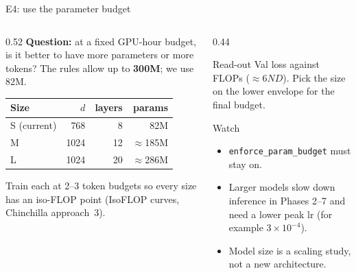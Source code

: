 \documentclass[aspectratio=169,11pt]{beamer}
\newcommand{\code}[1]{\texttt{\small #1}}
\begin{document}
\begin{frame}{E4: use the parameter budget}
  \begin{columns}[T]
    \begin{column}{0.52\textwidth}
      \small
      \textbf{Question:} at a fixed GPU-hour budget, is it better to have more parameters or more tokens?
      The rules allow up to \textbf{300M}; we use 82M.

      \vspace{2mm}
      \begin{tabular}{@{}lrrr@{}}
        \toprule
        Size & $d$ & layers & params\\
        \midrule
        S (current) & 768 & 8 & 82M\\
        M & 1024 & 12 & $\approx$185M\\
        L & 1024 & 20 & $\approx$286M\\
        \bottomrule
      \end{tabular}

      \vspace{2mm}
      Train each at 2--3 token budgets so every size has an iso-FLOP point (IsoFLOP curves, Chinchilla approach~3).
    \end{column}
    \begin{column}{0.44\textwidth}
      \begin{block}{Read-out}
        \small Val loss against FLOPs ($\approx 6ND$). Pick the size on the lower envelope for the final budget.
      \end{block}
      \begin{alertblock}{Watch}
        \small
        \begin{itemize}
          \item \code{enforce\_param\_budget} must stay on.
          \item Larger models slow down inference in Phases 2--7 and need a lower peak lr (for example $3\!\times\!10^{-4}$).
          \item Model size is a scaling study, not a new architecture.
        \end{itemize}
      \end{alertblock}
    \end{column}
  \end{columns}
\end{frame}
\end{document}
